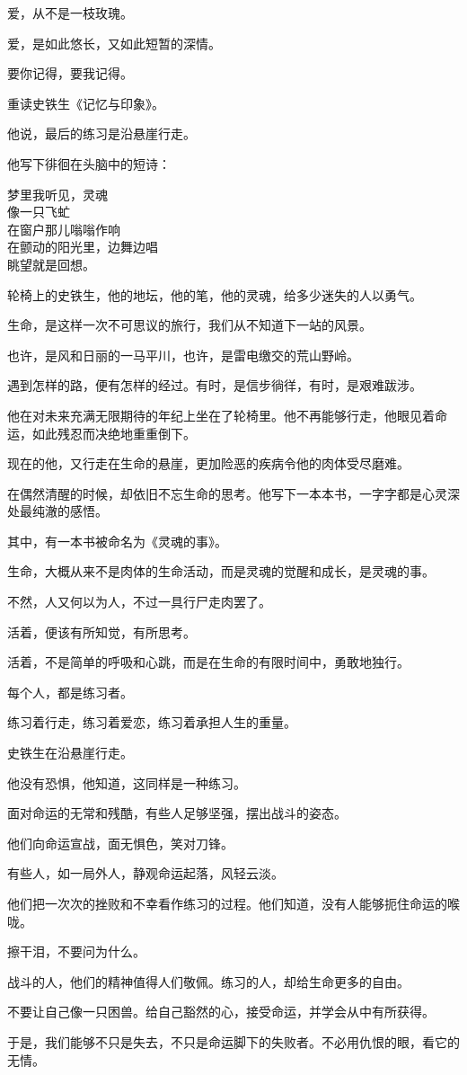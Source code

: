 		爱，从不是一枝玫瑰。\par
		爱，是如此悠长，又如此短暂的深情。\par
		要你记得，要我记得。

	\endwriting



		重读史铁生《记忆与印象》。\par
		他说，最后的练习是沿悬崖行走。\par
		他写下徘徊在头脑中的短诗：

		\longpoem{}{}{}
			梦里我听见，灵魂 \\
			像一只飞虻 \\
			在窗户那儿嗡嗡作响 \\
			在颤动的阳光里，边舞边唱 \\
			眺望就是回想。
		\endlongpoem

		轮椅上的史铁生，他的地坛，他的笔，他的灵魂，给多少迷失的人以勇气。\par
		生命，是这样一次不可思议的旅行，我们从不知道下一站的风景。\par
		也许，是风和日丽的一马平川，也许，是雷电缴交的荒山野岭。\par
		遇到怎样的路，便有怎样的经过。有时，是信步徜徉，有时，是艰难跋涉。\par
		他在对未来充满无限期待的年纪上坐在了轮椅里。他不再能够行走，他眼见着命运，如此残忍而决绝地重重倒下。\par
		现在的他，又行走在生命的悬崖，更加险恶的疾病令他的肉体受尽磨难。\par
		在偶然清醒的时候，却依旧不忘生命的思考。他写下一本本书，一字字都是心灵深处最纯澈的感悟。\par
		其中，有一本书被命名为《灵魂的事》。\par
		生命，大概从来不是肉体的生命活动，而是灵魂的觉醒和成长，是灵魂的事。\par
		不然，人又何以为人，不过一具行尸走肉罢了。\par
		活着，便该有所知觉，有所思考。\par
		活着，不是简单的呼吸和心跳，而是在生命的有限时间中，勇敢地独行。\par
		每个人，都是练习者。\par
		练习着行走，练习着爱恋，练习着承担人生的重量。\par
		史铁生在沿悬崖行走。\par
		他没有恐惧，他知道，这同样是一种练习。\par
		面对命运的无常和残酷，有些人足够坚强，摆出战斗的姿态。\par
		他们向命运宣战，面无惧色，笑对刀锋。\par
		有些人，如一局外人，静观命运起落，风轻云淡。\par
		他们把一次次的挫败和不幸看作练习的过程。他们知道，没有人能够扼住命运的喉咙。\par
		擦干泪，不要问为什么。\par
		战斗的人，他们的精神值得人们敬佩。练习的人，却给生命更多的自由。\par
		不要让自己像一只困兽。给自己豁然的心，接受命运，并学会从中有所获得。\par
		于是，我们能够不只是失去，不只是命运脚下的失败者。不必用仇恨的眼，看它的无情。

